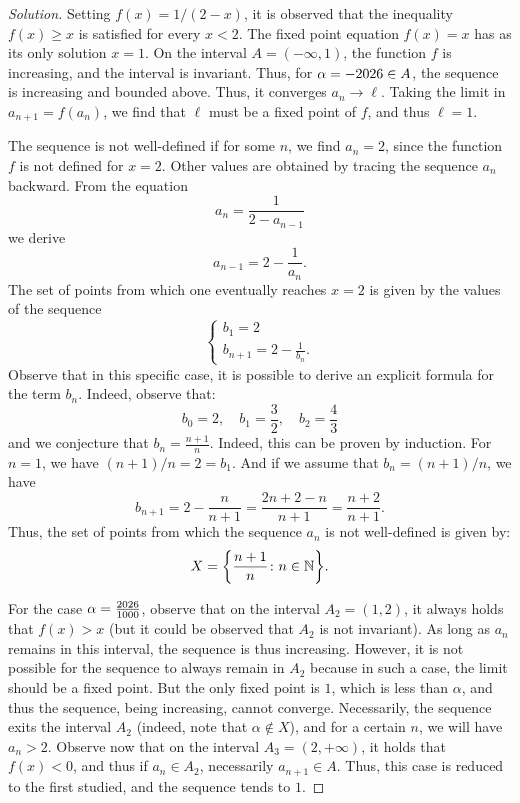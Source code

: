 \begin{proof}[Solution]
Setting $f(x) = 1/(2-x)$,
it is observed that the inequality $f(x)\ge x$ is satisfied for every
$x<2$. The fixed point equation $f(x)=x$ has as its only solution
$x=1$. On the interval $A=(-\infty,1)$, the function $f$ is increasing, and
the interval is invariant. Thus, for
$\alpha=-\the\year \in A$, the sequence is increasing and bounded above. Thus,
it converges $a_n\to \ell$. Taking the limit in
$a_{n+1} = f(a_n)$, we find that $\ell$ must be a fixed point of
$f$, and thus $\ell = 1$.

The sequence is not well-defined if for some $n$, we find
$a_n=2$, since the function $f$ is not defined for $x=2$. Other
values are obtained by tracing the sequence $a_n$ backward.
From the equation
\[
a_n = \frac{1}{2-a_{n-1}}
\]
we derive
\[
a_{n-1} = 2-\frac{1}{a_n}.
\]
The set of points from which one eventually reaches $x=2$ is
given by the values of the sequence
\[
\begin{cases}
  b_1 = 2\\
  b_{n+1} = 2 - \frac{1}{b_n}.
\end{cases}
\]
Observe that in this specific case, it is possible to derive an
explicit formula for the term $b_n$. Indeed, observe that:
\[
b_0 = 2,\quad
b_1 = \frac{3}{2},\quad
b_2 = \frac{4}{3}
\]
and we conjecture that $b_n = \frac{n+1} n$. Indeed, this
can be proven by induction. For $n=1$, we have $(n+1)/n = 2 =
b_1$. And if we assume that $b_n = (n+1)/n$, we have
\[
b_{n+1} = 2 - \frac{n}{n+1} = \frac{2n+2-n}{n+1} = \frac{n+2}{n+1}.
\]
Thus, the set of points from which the sequence $a_n$ is not
well-defined is given by:
\[
  X= {\left\{ \frac{n+1}{n}\colon n \in {\mathbb N} \right\}}.
\]

For the case $\alpha=\frac{\the\year}{1000}$, observe that on the interval
$A_2 = (1,2)$, it always holds that $f(x)>x$ (but it could be observed that
$A_2$ is not invariant). As long as $a_n$ remains in
this interval, the sequence is thus increasing. However, it is
not possible for the sequence to always remain in $A_2$ because in such
a case, the limit should be a fixed
point. But the only fixed point is $1$, which is less than $\alpha$, and thus
the sequence, being increasing, cannot converge. Necessarily, the
sequence exits the interval $A_2$ (indeed, note that $\alpha
\not \in X$), and for a certain $n$, we will have $a_n>2$. Observe now that
on the interval $A_3 = (2,+\infty)$, it holds that $f(x)<0$, and thus
if $a_n\in A_2$, necessarily $a_{n+1} \in A$. Thus, this case is
reduced to the first studied, and the sequence tends to $1$.
\end{proof}

